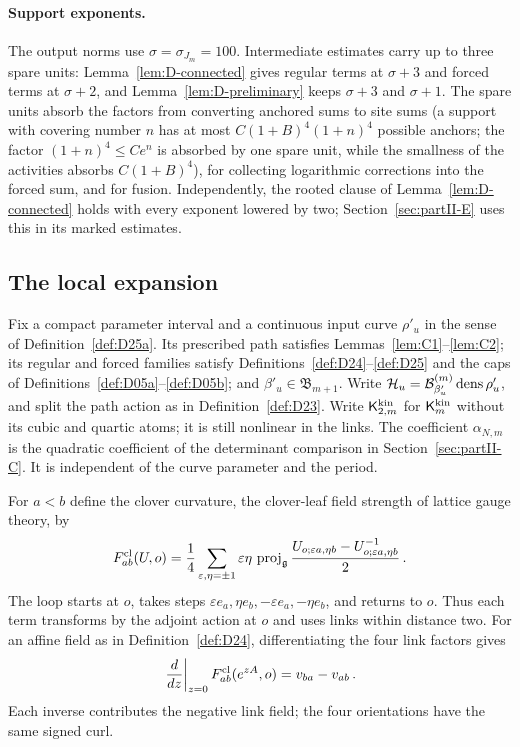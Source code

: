 \paragraph{Support exponents.} The output norms use $\sigma=\sigma_{J_m}=100$. Intermediate estimates carry up to three spare units: Lemma~\ref{lem:D-connected} gives regular terms at $\sigma+3$ and forced terms at $\sigma+2$, and Lemma~\ref{lem:D-preliminary} keeps $\sigma+3$ and $\sigma+1$. The spare units absorb the factors from converting anchored sums to site sums (a support with covering number $n$ has at most $C(1+B)^4(1+n)^4$ possible anchors; the factor $(1+n)^4\le Ce^n$ is absorbed by one spare unit, while the smallness of the activities absorbs $C(1+B)^4$), for collecting logarithmic corrections into the forced sum, and for fusion. Independently, the rooted clause of Lemma~\ref{lem:D-connected} holds with every exponent lowered by two; Section~\ref{sec:partII-E} uses this in its marked estimates.


\subsection{The local expansion}\label{subsec:D-local}

Fix a compact parameter interval and a continuous input curve $\rho'_u$ in the sense of Definition~\ref{def:D25a}. Its prescribed path satisfies Lemmas~\ref{lem:C1}--\ref{lem:C2}; its regular and forced families satisfy Definitions~\ref{def:D24}--\ref{def:D25} and the caps of Definitions~\ref{def:D05a}--\ref{def:D05b}; and $\beta'_u\in\mathfrak B_{m+1}$. Write $\mathcal H_u=\mathcal{B}^{(m)}_{\beta'_u}\operatorname{dens}\rho'_u$, and split the path action as in Definition~\ref{def:D23}. Write $\mathsf K_{2,m}^{\rm kin}$ for $\mathsf K_m^{\rm kin}$ without its cubic and quartic atoms; it is still nonlinear in the links. The coefficient $\alpha_{N,m}$ is the quadratic coefficient of the determinant comparison in Section~\ref{sec:partII-C}. It is independent of the curve parameter and the period.

For $a<b$ define the clover curvature, the clover-leaf field strength of lattice gauge theory, by
\begin{equation*}
F^{\rm cl}_{ab}(U,o)=\frac14\sum_{\varepsilon,\eta=\pm1}\varepsilon\eta\,
\operatorname{proj}_{\mathfrak{g}}\frac{U_{o;\varepsilon a,\eta b}-U_{o;\varepsilon a,\eta b}^{-1}}2\,.
\end{equation*}
The loop starts at $o$, takes steps $\varepsilon e_a,\eta e_b,-\varepsilon e_a,-\eta e_b$, and returns to $o$. Thus each term transforms by the adjoint action at $o$ and uses links within distance two. For an affine field as in Definition~\ref{def:D24}, differentiating the four link factors gives
\begin{equation}\label{eq:D-clover-linear}
\left.\frac d{dz}\right|_{z=0}F^{\rm cl}_{ab}(e^{zA},o)=v_{ba}-v_{ab}\,.
\end{equation}
Each inverse contributes the negative link field; the four orientations have the same signed curl.

